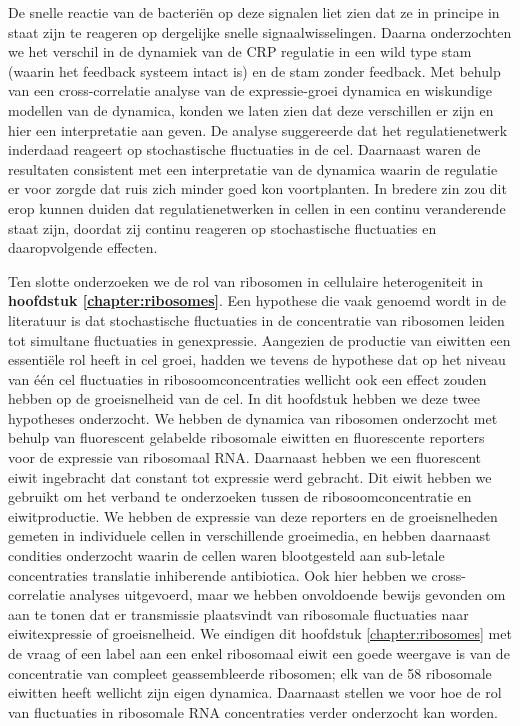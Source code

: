 %
De snelle reactie van de bacteriën op deze signalen liet zien dat ze in principe in staat zijn 
te reageren op dergelijke snelle signaalwisselingen.
%
%
Daarna onderzochten we het verschil in de dynamiek van de CRP regulatie in een wild type \ecoli stam (waarin het feedback systeem intact is) en de \ecoli stam zonder feedback.
%
Met behulp van een cross-correlatie analyse van de expressie-groei dynamica en wiskundige modellen van de dynamica, konden we laten zien dat deze verschillen er zijn en hier een interpretatie aan geven.
%
De analyse suggereerde dat het regulatienetwerk inderdaad reageert op stochastische fluctuaties in de cel.
Daarnaast waren de resultaten consistent met een interpretatie van de dynamica waarin de regulatie er voor zorgde dat ruis zich minder goed kon voortplanten.
%
In bredere zin zou dit erop kunnen duiden dat regulatienetwerken in cellen in een continu veranderende staat zijn, doordat zij continu reageren op stochastische fluctuaties en daaropvolgende effecten.


Ten slotte onderzoeken we de rol van ribosomen in cellulaire heterogeniteit in \textbf{hoofdstuk \ref{chapter:ribosomes}}.
%
Een hypothese die vaak genoemd wordt in de 
literatuur is dat stochastische fluctuaties in de concentratie van ribosomen leiden tot 
simultane fluctuaties in genexpressie. 
%
Aangezien de productie van eiwitten een essentiële 
rol heeft in cel groei,
hadden we tevens de hypothese dat op het niveau van één cel fluctuaties in ribosoomconcentraties wellicht ook een effect zouden hebben op de groeisnelheid van de cel.
%
In dit hoofdstuk hebben we deze twee hypotheses onderzocht.
% 
We hebben de dynamica van ribosomen onderzocht met behulp van fluorescent gelabelde ribosomale eiwitten en fluorescente reporters voor de expressie van ribosomaal RNA.
%
Daarnaast hebben we een fluorescent eiwit ingebracht dat constant tot expressie werd gebracht.
%
Dit eiwit hebben we gebruikt om het verband te onderzoeken tussen de ribosoomconcentratie en eiwitproductie.
%
We hebben de expressie van deze reporters en de groeisnelheden gemeten in individuele cellen in verschillende groeimedia, en hebben daarnaast condities onderzocht waarin de cellen waren blootgesteld aan sub-letale concentraties translatie inhiberende antibiotica.
%
Ook hier hebben we cross-correlatie analyses uitgevoerd, 
maar we hebben onvoldoende bewijs gevonden om aan te tonen
dat er transmissie plaatsvindt van ribosomale fluctuaties 
naar eiwitexpressie of groeisnelheid.
%
We eindigen dit hoofdstuk \ref{chapter:ribosomes} met de vraag of een label aan een enkel ribosomaal eiwit een goede weergave is van de concentratie van compleet geassembleerde ribosomen; elk van de 58 ribosomale eiwitten heeft wellicht zijn eigen dynamica.
%
Daarnaast stellen we voor hoe de rol van fluctuaties in ribosomale RNA concentraties verder onderzocht kan worden.





